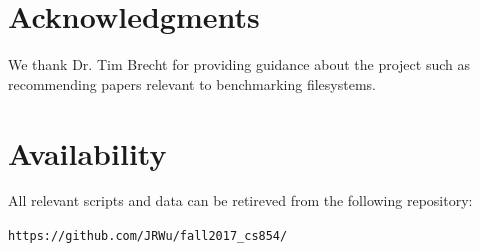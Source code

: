 \documentclass[letterpaper,twocolumn,10pt]{article}
\begin{document}
\section{Acknowledgments}
We thank Dr. Tim Brecht for providing guidance about the project such as recommending papers relevant to benchmarking filesystems. 

\section{Availability}\label{Availability}
All relevant scripts and data can be retireved from the following repository:
\begin{center}
{\tt https://github.com/JRWu/fall2017\_cs854/}
\end{center}


{\footnotesize 

\theendnotes


\newpage
}
\end{document}

